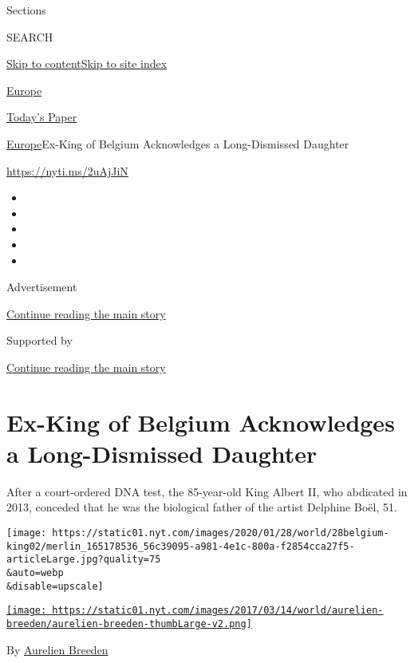 Sections

SEARCH

\protect\hyperlink{site-content}{Skip to
content}\protect\hyperlink{site-index}{Skip to site index}

\href{https://www.nytimes.com/section/world/europe}{Europe}

\href{https://myaccount.nytimes.com/auth/login?response_type=cookie\&client_id=vi}{}

\href{https://www.nytimes.com/section/todayspaper}{Today's Paper}

\href{/section/world/europe}{Europe}\textbar{}Ex-King of Belgium
Acknowledges a Long-Dismissed Daughter

\url{https://nyti.ms/2uAjJiN}

\begin{itemize}
\item
\item
\item
\item
\item
\end{itemize}

Advertisement

\protect\hyperlink{after-top}{Continue reading the main story}

Supported by

\protect\hyperlink{after-sponsor}{Continue reading the main story}

\hypertarget{ex-king-of-belgium-acknowledges-a-long-dismissed-daughter}{%
\section{Ex-King of Belgium Acknowledges a Long-Dismissed
Daughter}\label{ex-king-of-belgium-acknowledges-a-long-dismissed-daughter}}

After a court-ordered DNA test, the 85-year-old King Albert II, who
abdicated in 2013, conceded that he was the biological father of the
artist Delphine Boël, 51.

\texttt{[image: https://static01.nyt.com/images/2020/01/28/world/28belgium-king02/merlin\_165178536\_56c39095-a981-4e1c-800a-f2854cca27f5-articleLarge.jpg?quality=75\\\&auto=webp\\\&disable=upscale]}

\href{https://www.nytimes.com/by/aurelien-breeden}{\texttt{[image: https://static01.nyt.com/images/2017/03/14/world/aurelien-breeden/aurelien-breeden-thumbLarge-v2.png]}}

By \href{https://www.nytimes.com/by/aurelien-breeden}{Aurelien Breeden}

